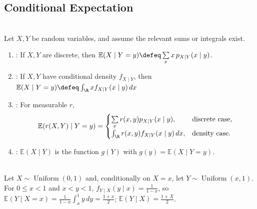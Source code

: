 \subsection{Conditional Expectation}
\begin{definition} \label{def:conditional-expectation-given-random-variable-elementary} \\
Let $X,Y$ be random variables, and assume the relevant sums or integrals exist.
\begin{enumerate}[label=(\roman*)]
\setlength{\itemsep}{0pt}
\item {}: If $X,Y$ are discrete, then $\mathbb{E}(X\mid Y=y)\defeq\sum\limits_x x\,p_{X\mid Y}(x\mid y)$.
\item {}: If $X,Y$ have conditional density $f_{X\mid Y}$, then $\mathbb{E}(X\mid Y=y)\defeq\int_{\R}x f_{X\mid Y}(x\mid y)\,dx$
\item {}: For measurable $r$,
\begin{equation*}
\mathbb{E}(r(X,Y)\mid Y=y)
=
\begin{cases}
\sum\limits_x r(x,y)p_{X\mid Y}(x\mid y),&\text{discrete case},\\[2mm]
\int_{\R}r(x,y)f_{X\mid Y}(x\mid y)\,dx,&\text{density case}.
\end{cases}
\end{equation*}
\item {}: $\mathbb{E}(X\mid Y)$ is the function $g(Y)$ with $g(y)=\mathbb{E}(X\mid Y=y)$.
\end{enumerate}
\end{definition}

\begin{example} \label{ex:conditional-uniform-triangle} \\
Let $X\sim\operatorname{Uniform}(0,1)$ and, conditionally on $X=x$, let $Y\sim\operatorname{Uniform}(x,1)$.\\
For $0\leq x<1$ and $x<y<1$, $f_{Y\mid X}(y\mid x)=\frac{1}{1-x}$, so $\mathbb{E}(Y\mid X=x)=\frac{1}{1-x}\int_x^1 y\,dy=\frac{1+x}{2}$; $\mathbb{E}(Y\mid X)=\frac{1+X}{2}$.
\end{example}


